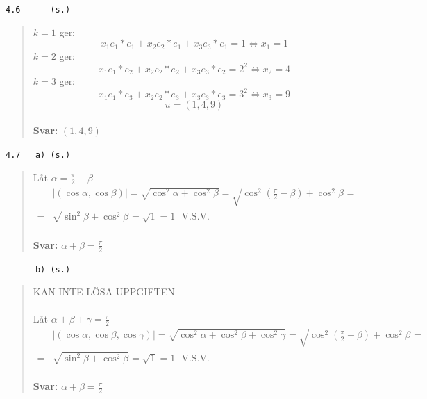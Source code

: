 \documentclass[a4paper]{article}
\newcommand{\tskcol}[1]{\textcolor{tskcol}{#1}}
\begin{document}
\texttt{\tskcol{4.6~~~~~ (s.)}}
\begin{quotation}
	\noindent
	$k=1$ ger:
	\[x_1e_1*e_1+x_2e_2*e_1+x_3e_3*e_1=1 \Leftrightarrow
	x_1=1\]
	$k=2$ ger:
	\[x_1e_1*e_2+x_2e_2*e_2+x_3e_3*e_2=2^2 \Leftrightarrow
	x_2=4\]
	$k=3$ ger:
	\[x_1e_1*e_3+x_2e_2*e_3+x_3e_3*e_3=3^2 \Leftrightarrow
	x_3=9\]
	\[u=(1,4,9)\]
	\\
	\textbf{Svar:} $(1,4,9)$
\end{quotation}

\texttt{\tskcol{4.7~~~a) (s.)}}
\begin{quotation}
	\noindent
	Låt $\alpha=\frac{\pi}{2}-\beta$
	\begin{align*}
	&|(\cos\alpha,\cos\beta)|=
	\sqrt{\cos^2\alpha+\cos^2\beta}=
	\sqrt{\cos^2(\frac{\pi}{2}-\beta)+\cos^2\beta}= \\ =
	&\sqrt{\sin^2\beta+\cos^2\beta}=
	\sqrt{1}=1 \text{~~V.S.V.}
	\end{align*}
	\\
	\textbf{Svar:} $\alpha+\beta=\frac{\pi}{2}$
\end{quotation}

\texttt{\tskcol{~~~~~~b) (s.)}}
\begin{quotation}
	\noindent
	KAN INTE LÖSA UPPGIFTEN \\ \\
	Låt $\alpha+\beta+\gamma=\frac{\pi}{2}$
	\begin{align*}
	&|(\cos\alpha,\cos\beta,\cos\gamma)|=
	\sqrt{\cos^2\alpha+\cos^2\beta+\cos^2\gamma}=
	\sqrt{\cos^2(\frac{\pi}{2}-\beta)+\cos^2\beta}= \\ =
	&\sqrt{\sin^2\beta+\cos^2\beta}=
	\sqrt{1}=1 \text{~~V.S.V.}
	\end{align*}
	\\
	\textbf{Svar:} $\alpha+\beta=\frac{\pi}{2}$
\end{quotation}
\end{document}
